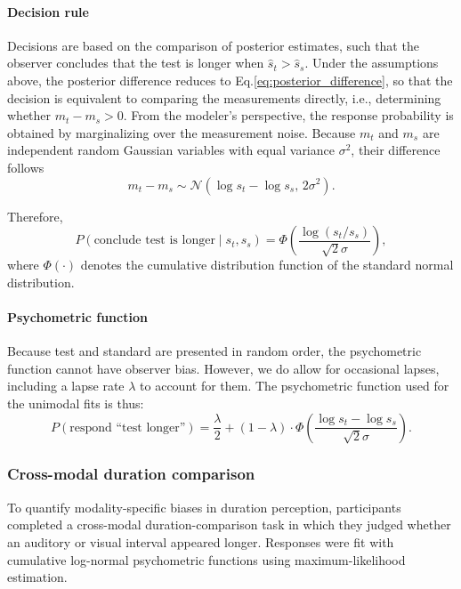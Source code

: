 \documentclass{jov}
\begin{document}
\paragraph{Decision rule}

Decisions are based on the comparison of posterior estimates, such that the observer concludes that the test is longer when $\hat{s}_t > \hat{s}_s$. Under the assumptions above, the posterior difference reduces to Eq.\ref{eq:posterior_difference}, so that the decision is equivalent to comparing the measurements directly, i.e., determining whether $m_t - m_s> 0$. From the modeler's perspective, the response probability is obtained by marginalizing over the measurement noise. Because $m_t$ and $m_s$ are independent random Gaussian variables with equal variance $\sigma^2$, their difference follows
\begin{equation}
m_t - m_s
\sim
\mathcal{N}\!\left(
\log s_t - \log s_s,
\, 2\sigma^2
\right).
\end{equation}

Therefore,
\begin{equation}
P(\text{conclude test is longer} \mid s_t, s_s)
=
\Phi\!\left(
\frac{\log(s_t/s_s)}{\sqrt{2}\sigma}
\right),
\end{equation}
where $\Phi(\cdot)$ denotes the cumulative distribution function of the standard normal distribution.

\paragraph{Psychometric function}
Because test and standard are presented in random order, the psychometric function cannot have observer bias. However, we do allow for occasional lapses, including a lapse rate $\lambda$ to account for them. The psychometric function used for the unimodal fits is thus:
\begin{equation}
P(\text{respond ``test longer''}) = \frac{\lambda}{2} + (1-\lambda) \cdot \Phi\left( \frac{\log s_t - \log s_s}{\sqrt{2}\sigma} \right).
\end{equation}

\subsubsection{Cross-modal duration comparison}

To quantify modality-specific biases in duration perception, participants completed a cross-modal duration-comparison task in which they judged whether an auditory or visual interval appeared longer. Responses were fit with cumulative log-normal psychometric functions using maximum-likelihood estimation.
\end{document}
